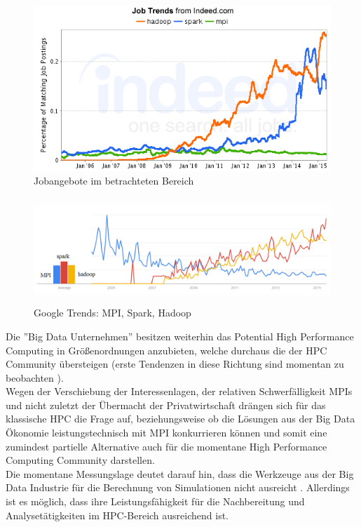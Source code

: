 \documentclass[
	12pt,
	a4paper,
	BCOR10mm,
	DIV14,
	listof=totoc,
	bibliography=totoc,
	headsepline
]{scrreprt}
\begin{document}
\begin{figure}[ht]
\centering
\includegraphics[scale=0.8]{./pics/jobgraph.png}
\caption{Jobangebote im betrachteten Bereich}
\label{fig:hpcdies1}
\end{figure}

\begin{figure}[ht]
\centering
\includegraphics[width=1\textwidth, height=150px]{./pics/trends.png}
\caption{Google Trends: MPI, Spark, Hadoop}
\label{fig:hpcdies2}
\end{figure}
Die ''Big Data Unternehmen'' besitzen weiterhin das Potential High Performance Computing in Größenordnungen anzubieten, welche durchaus die der HPC Community übersteigen (erste Tendenzen in diese Richtung sind momentan zu beobachten \cite{HLR}). \\
Wegen der Verschiebung der Interessenlagen, der relativen Schwerfälligkeit MPIs und nicht zuletzt der Übermacht der Privatwirtschaft drängen sich für das klassische HPC die Frage auf, beziehungsweise ob die Lösungen aus der Big Data Ökonomie leistungstechnisch mit MPI konkurrieren können und somit eine zumindest partielle Alternative auch für die momentane High Performance Computing Community darstellen.\\
Die momentane Messungslage deutet darauf hin, dass die Werkzeuge aus der Big Data Industrie für die Berechnung von Simulationen nicht ausreicht \cite{HLR}.
Allerdings ist es möglich, dass ihre Leistungsfähigkeit für die Nachbereitung und Analysetätigkeiten im HPC-Bereich ausreichend ist. \\
\FloatBarrier
\end{document}
